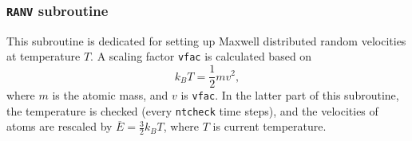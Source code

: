 
\subsubsection{\texttt{RANV} subroutine}
\label{sssec:ranv}

This subroutine is dedicated for setting up Maxwell distributed random velocities
at temperature $T$. A scaling factor \texttt{vfac} is calculated based on
\begin{equation}
k_B T = \frac{ 1 }{ 2 } m v^2,
\end{equation}
where $m$ is the atomic mass, and $v$ is \texttt{vfac}.
In the latter part of this subroutine, the temperature is checked (every \texttt{ntcheck} time steps),
and the velocities of atoms are rescaled by $\overline{E} = \frac{ 3 }{ 2 } k_B T$, where $T$ is current
temperature.
